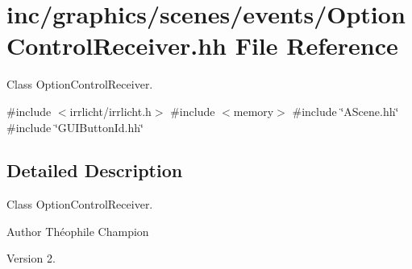 \hypertarget{OptionControlReceiver_8hh}{}\section{inc/graphics/scenes/events/\+Option\+Control\+Receiver.hh File Reference}
\label{OptionControlReceiver_8hh}


Class Option\+Control\+Receiver.  


{\ttfamily \#include $<$irrlicht/irrlicht.\+h$>$}\newline
{\ttfamily \#include $<$memory$>$}\newline
{\ttfamily \#include \char`\"{}A\+Scene.\+hh\char`\"{}}\newline
{\ttfamily \#include \char`\"{}G\+U\+I\+Button\+Id.\+hh\char`\"{}}\newline


\subsection{Detailed Description}
Class Option\+Control\+Receiver. 

\begin{DoxyAuthor}{Author}
Théophile Champion 
\end{DoxyAuthor}
\begin{DoxyVersion}{Version}
2. 
\end{DoxyVersion}
